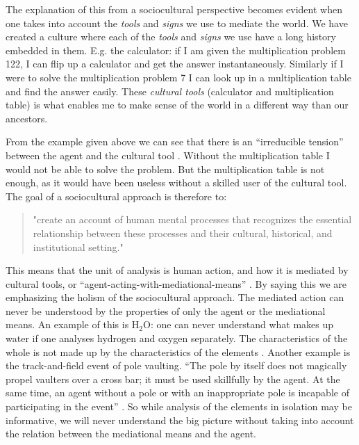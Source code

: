 The explanation of this from a sociocultural perspective becomes evident when one takes into account the \emph{tools} and \emph{signs} we use to mediate the world. We have created a culture where each of the \emph{tools} and \emph{signs} we use have a long history embedded in them. E.g. the calculator: if I am given the multiplication problem 122, I can flip up a calculator and get the answer instantaneously. Similarly if I were to solve the multiplication problem 7 I can look up in a multiplication table and find the answer easily. These \emph{cultural tools} (calculator and multiplication table) is what enables me to make sense of the world in a different way than our ancestors. 

From the example given above we can see that there is an “irreducible tension” between the agent and the cultural tool \citep{wertsch1998mind}. Without the multiplication table I would not be able to solve the problem. But the multiplication table is not enough, as it would have been useless without a skilled user of the cultural tool. The goal of a sociocultural approach is therefore to: 

\begin{quote}
"create an account of human mental processes that recognizes the essential relationship between these processes and their cultural, historical, and institutional setting."\citep{wertsch1998mind} 
\end{quote}

This means that the unit of analysis is human action, and how it is mediated by cultural tools, or “agent-acting-with-mediational-means” \citep[\citealp{wertsch1993sociocultural} cited in][]{wertsch1998mind}. By saying this we are emphasizing the holism of the sociocultural approach. The mediated action can never be understood by the properties of only the agent or the mediational means. An example of this is $\text{H}_2\text{O}$: one can never understand what makes up water if one analyses hydrogen and oxygen separately. The characteristics of the whole is not made up by the characteristics of the elements \citep{vygotskiui1978mind}. Another example is the track-and-field event of pole vaulting. “The pole by itself does not magically propel vaulters over a cross bar; it must be used skillfully by the agent. At the same time, an agent without a pole or with an inappropriate pole is incapable of participating in the event” \citep{wertsch1998mind}. So while analysis of the elements in isolation may be informative, we will never understand the big picture without taking into account the relation between the mediational means and the agent.  


